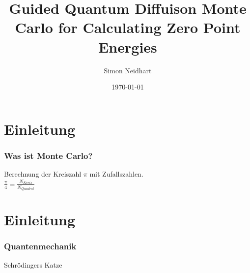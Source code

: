 \documentclass{beamer}
\title{Guided Quantum Diffuison Monte Carlo for Calculating Zero Point Energies}
\author{Simon Neidhart}
\date{\today}
\begin{document}
\frame{\titlepage}

\section{Einleitung}
\begin{frame}
\frametitle{Was ist Monte Carlo?}
\begin{center}
Berechnung der Kreiszahl $\pi$ mit Zufallszahlen.
\\ 
$\frac{\pi}{4} = \frac{N_{Kreis}}{N_{Quadrat}}$
\end{center}
\end{frame}

\section{Einleitung}
\begin{frame}
\frametitle{Quantenmechanik}
\begin{center}
Schrödingers Katze\\
\smallskip
{}\\ 
\end{center}
\end{frame}
\end{document}

